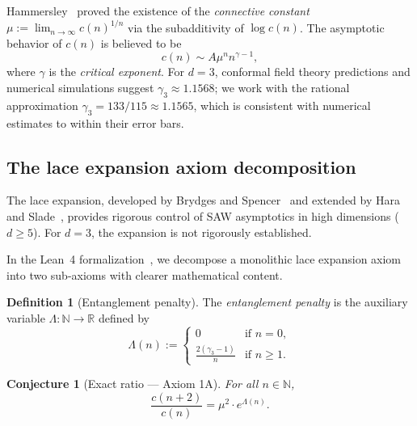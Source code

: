 \documentclass[11pt,a4paper]{article}
\newtheorem{conjecture}{Conjecture}[section]
\theoremstyle{definition}
\newtheorem{definition}[theorem]{Definition}
\theoremstyle{remark}
\begin{document}
Hammersley~\cite{Hammersley1957} proved the existence of the
\emph{connective constant} $\mu := \lim_{n \to \infty} c(n)^{1/n}$
via the subadditivity of $\log c(n)$. The asymptotic behavior of
$c(n)$ is believed to be
\begin{equation}\label{eq:saw-asymptotic}
  c(n) \sim A \mu^n n^{\gamma - 1},
\end{equation}
where $\gamma$ is the \emph{critical exponent}. For $d = 3$,
conformal field theory predictions and numerical simulations suggest
$\gamma_3 \approx 1.1568$; we work with the rational approximation
$\gamma_3 = 133/115 \approx 1.1565$, which is consistent with
numerical estimates to within their error bars.

\subsection{The lace expansion axiom decomposition}

The lace expansion, developed by Brydges and
Spencer~\cite{BrydgesSpencer1985} and extended by Hara and
Slade~\cite{HaraSlade1992}, provides rigorous control of SAW
asymptotics in high dimensions ($d \ge 5$). For $d = 3$, the
expansion is not rigorously established.

In the Lean~4 formalization~\cite{SocrateAI2026}, we decompose a
monolithic lace expansion axiom into two sub-axioms with clearer
mathematical content.

\begin{definition}[Entanglement penalty]\label{def:penalty}
The \emph{entanglement penalty} is the auxiliary variable
$\Lambda \colon \mathbb{N} \to \mathbb{R}$ defined by
\begin{equation}\label{eq:penalty-def}
  \Lambda(n) :=
  \begin{cases}
    0 & \text{if } n = 0, \\
    \displaystyle\frac{2(\gamma_3 - 1)}{n} & \text{if } n \ge 1.
  \end{cases}
\end{equation}
\end{definition}

\begin{conjecture}[Exact ratio --- Axiom 1A]\label{conj:axiom1a}
For all $n \in \mathbb{N}$,
\begin{equation}\label{eq:exact-ratio}
  \frac{c(n+2)}{c(n)} = \mu^2 \cdot e^{\Lambda(n)}.
\end{equation}
\end{conjecture}
\end{document}

